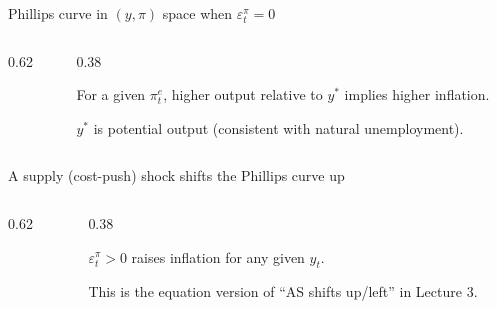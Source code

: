\documentclass[aspectratio=169,xcolor=dvipsnames]{beamer}
\let\tempone\itemize
\let\temptwo\enditemize
\renewenvironment{itemize}{\tempone\addtolength{\itemsep}{\fill}}{\temptwo}
\newcommand{\axes}[4]{%
  \draw[axis] (#1,0) -- (#2,0);
  \draw[axis] (0,#3) -- (0,#4);
}
\newcommand{\xlabel}[1]{\node[below right] at (2.75,0) {#1};}
\newcommand{\ylabel}[1]{\node[above left] at (0,3.95) {#1};}
\begin{document}
\begin{frame}{Phillips curve in $(y,\pi)$ space when $\varepsilon_t^\pi=0$}
\begin{columns}
\begin{column}{0.62\textwidth}
\centering
{}
\end{column}
\begin{column}{0.38\textwidth}
\small
\begin{itemize}
\item For a given $\pi_t^e$, higher output relative to $y^\ast$ implies higher inflation.
\item $y^\ast$ is potential output (consistent with natural unemployment).
\end{itemize}
\end{column}
\end{columns}
\end{frame}

\begin{frame}{A supply (cost-push) shock shifts the Phillips curve up}
\begin{columns}
\begin{column}{0.62\textwidth}
\centering
{}
\end{column}
\begin{column}{0.38\textwidth}
\small
\begin{itemize}
\item $\varepsilon_t^\pi>0$ raises inflation for any given $y_t$.
\item This is the equation version of ``AS shifts up/left'' in Lecture 3.
\end{itemize}
\end{column}
\end{columns}
\end{frame}
\end{document}
